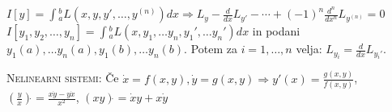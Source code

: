 \documentclass[8pt,a4paper]{amsart}
\theoremstyle{definition} %
\theoremstyle{plain} %
\let\oldint\int
\renewcommand{\int}{\oldint \!}
\begin{document}
$I[y]=\int_a^bL(x,y,y',\ldots ,y^{(n)})dx \Longrightarrow L_y -\frac{d}{dx}L_{y'} - \cdots + (-1)^n \frac{d^n}{dx^n}L_{y^{(n)}}=0$
\\

$I[y_1,y_2,\ldots ,y_n] = \int_a^b L(x,y_1,\ldots y_n, y_1',\ldots y_n')dx$ in podani $y_1(a),\ldots y_n(a), y_1(b),\ldots y_n(b)$. Potem za $i = 1,\ldots ,n$ velja: $L_{y_i} = \frac{d}{dx}L_{y_i'}$.

\textsc{Nelinearni sistemi:} Če $\dot{x} = f(x,y), \dot{y} = g(x,y) \Longrightarrow y'(x)=\frac{g(x,y)}{f(x,y)}$, $(\frac{y}{x})\dot{ } = \frac{x\dot{y}-y\dot{x}}{x^2}$, $(xy)\dot{ } = \dot{x}y+x\dot{y}$
%
%


\end{document}
